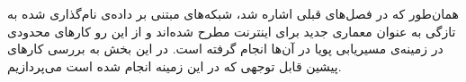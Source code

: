 

همان‌طور که در فصل‌های قبلی اشاره شد، شبکه‌های مبتنی بر داده‌ی نام‌گذاری شده به تازگی به عنوان معماری جدید برای اینترنت مطرح شده‌اند و از این رو کارهای محدودی در زمینه‌ی مسیریابی پویا در آن‌ها انجام گرفته است. در این بخش به بررسی کارهای پیشین قابل توجهی که در این زمینه انجام شده است می‌پردازیم.


